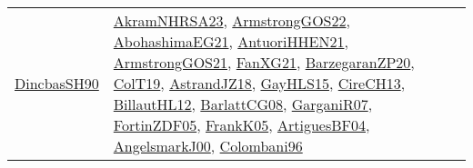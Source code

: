 {\begin{longtable}{lp{3cm}>{\raggedright}p{6cm}>{\raggedright}p{6cm}p{8cm}}
\href{articles/DincbasSH90.pdf}{DincbasSH90}\cite{DincbasSH90} & \href{articles/AkramNHRSA23.pdf}{AkramNHRSA23}\cite{AkramNHRSA23}, \href{papers/ArmstrongGOS22.pdf}{ArmstrongGOS22}\cite{ArmstrongGOS22}, \href{articles/AbohashimaEG21.pdf}{AbohashimaEG21}\cite{AbohashimaEG21}, \href{papers/AntuoriHHEN21.pdf}{AntuoriHHEN21}\cite{AntuoriHHEN21}, \href{papers/ArmstrongGOS21.pdf}{ArmstrongGOS21}\cite{ArmstrongGOS21}, \href{articles/FanXG21.pdf}{FanXG21}\cite{FanXG21}, \href{papers/BarzegaranZP20.pdf}{BarzegaranZP20}\cite{BarzegaranZP20}, \href{papers/ColT19.pdf}{ColT19}\cite{ColT19}, \href{papers/AstrandJZ18.pdf}{AstrandJZ18}\cite{AstrandJZ18}, \href{papers/GayHLS15.pdf}{GayHLS15}\cite{GayHLS15}, \href{papers/CireCH13.pdf}{CireCH13}\cite{CireCH13}, \href{papers/BillautHL12.pdf}{BillautHL12}\cite{BillautHL12}, \href{papers/BarlattCG08.pdf}{BarlattCG08}\cite{BarlattCG08}, \href{papers/GarganiR07.pdf}{GarganiR07}\cite{GarganiR07}, \href{papers/FortinZDF05.pdf}{FortinZDF05}\cite{FortinZDF05}, \href{papers/FrankK05.pdf}{FrankK05}\cite{FrankK05}, \href{papers/ArtiguesBF04.pdf}{ArtiguesBF04}\cite{ArtiguesBF04}, \href{papers/AngelsmarkJ00.pdf}{AngelsmarkJ00}\cite{AngelsmarkJ00}, \href{papers/Colombani96.pdf}{Colombani96}\cite{Colombani96}\\

\end{longtable}}
